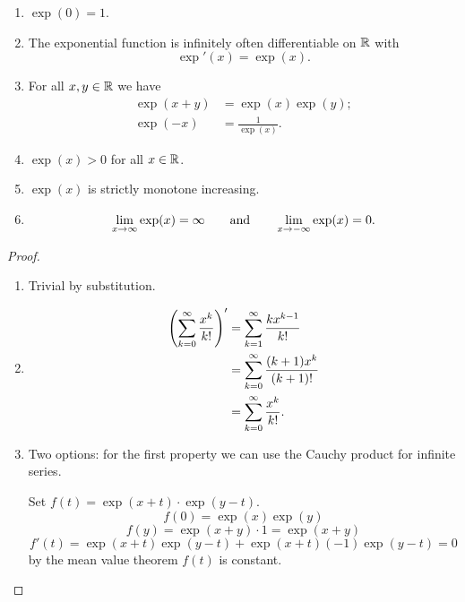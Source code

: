 \documentclass[10pt, a4paper]{article}
\begin{document}
\begin{theorem}
    \begin{enumerate}[label = (\roman*)]
        \item $\exp(0) = 1$.

        \item The exponential function is infinitely often differentiable on $\R$ with
        \[
        \exp'(x) = \exp(x).
        \]

        \item For all $x, y \in \R$ we have
        \begin{align*}
            \exp(x + y) &= \exp(x)\exp(y); \\
            \exp(-x) &= \frac{1}{\exp(x)}.
        \end{align*}

        \item $\exp(x) > 0$ for all $x \in \R$.

        \item $\exp(x)$ is strictly monotone increasing.

        \item
        \[
        \liminfty[x]\exp(x) = \infty\qquad\text{and}\qquad\lim_{x \to -\infty}\exp(x) = 0.
        \]
    \end{enumerate}

    \begin{proof}\phantom{}
        \begin{enumerate}[label = (\roman*)]
            \item Trivial by substitution.

            \item
            \begin{align*}
                \left(\infsumo \frac{x ^ k}{k!}\right)' &= \infsum\frac{kx ^ {k - 1}}{k!} \\
                &= \infsumo\frac{(k + 1)x ^ k}{(k + 1)!} \\
                &= \infsumo\frac{x ^ k}{k!}.
            \end{align*}

            \item Two options:
            for the first property we can use the Cauchy product for infinite series.

            Set $f(t) = \exp(x + t)\cdot\exp(y - t)$.
            \[
            f(0) = \exp(x)\exp(y)
            \]
            \[
            f(y) = \exp(x + y) \cdot 1 = \exp(x + y)
            \]
            \[
            f'(t) = \exp(x + t)\exp(y - t) + \exp(x + t)(-1)\exp(y - t) = 0
            \]
            by the mean value theorem $f(t)$ is constant.


\end{enumerate}
\end{proof}
\end{theorem}
\end{document}
